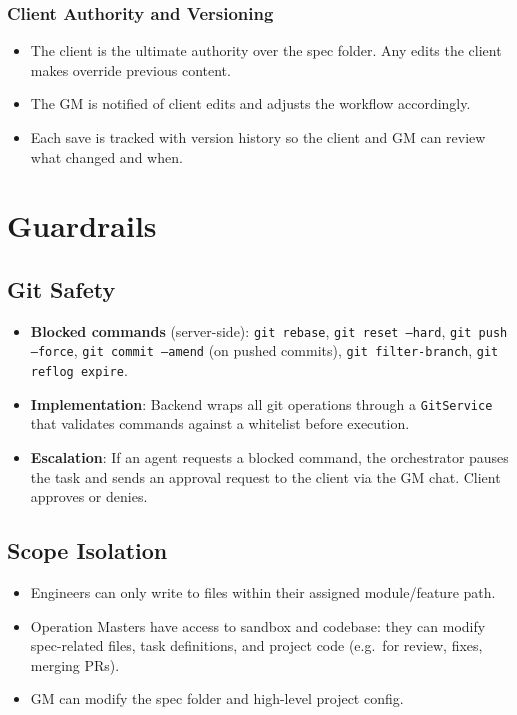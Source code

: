\documentclass[11pt,a4paper]{article}
\begin{document}
\subsubsection{Client Authority and Versioning}

\begin{itemize}
  \item The client is the ultimate authority over the spec folder. Any edits the client makes override previous content.
  \item The GM is notified of client edits and adjusts the workflow accordingly.
  \item Each save is tracked with version history so the client and GM can review what changed and when.
\end{itemize}

\section{Guardrails}

\subsection{Git Safety}

\begin{itemize}
  \item \textbf{Blocked commands} (server-side): \texttt{git rebase}, \texttt{git reset --hard}, \texttt{git push --force}, \texttt{git commit --amend} (on pushed commits), \texttt{git filter-branch}, \texttt{git reflog expire}.
  \item \textbf{Implementation}: Backend wraps all git operations through a \texttt{GitService} that validates commands against a whitelist before execution.
  \item \textbf{Escalation}: If an agent requests a blocked command, the orchestrator pauses the task and sends an approval request to the client via the GM chat. Client approves or denies.
\end{itemize}

\subsection{Scope Isolation}

\begin{itemize}
  \item Engineers can only write to files within their assigned module/feature path.
  \item Operation Masters have access to sandbox and codebase: they can modify spec-related files, task definitions, and project code (e.g.\ for review, fixes, merging PRs).
  \item GM can modify the spec folder and high-level project config.
\end{itemize}
\end{document}
